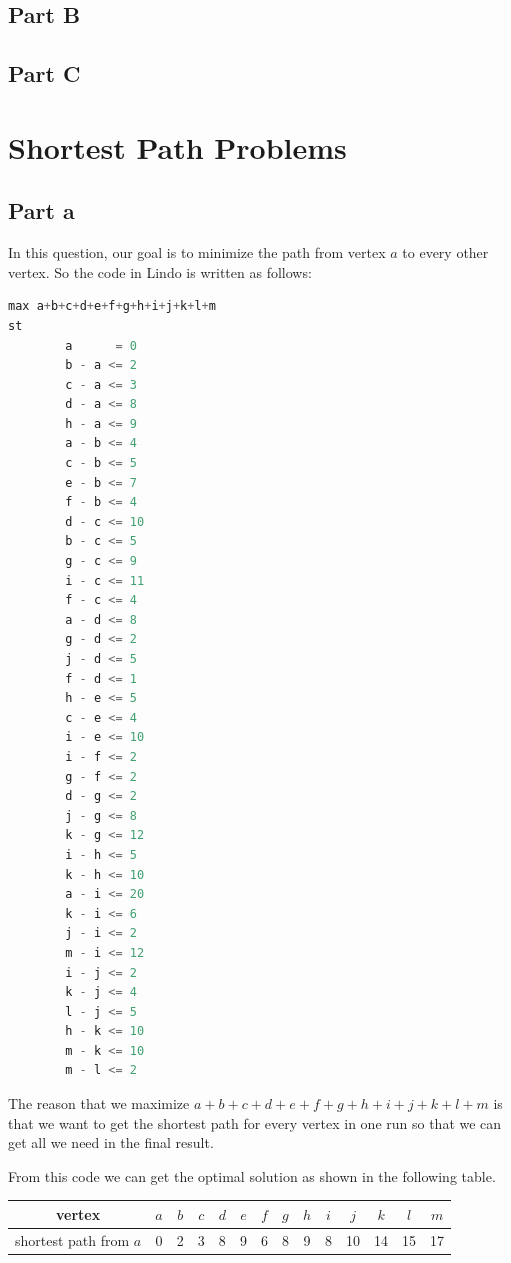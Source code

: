 \documentclass[11pt]{scrreprt}
\begin{document}
\section{Part B}


\section{Part C}

\chapter{Shortest Path Problems}

\section{Part a}
In this question, our goal is to minimize the path from vertex $a$ to every other vertex. So the code in Lindo is written as follows:
\begin{lstlisting}[language=c]
max a+b+c+d+e+f+g+h+i+j+k+l+m
st
        a      = 0 
        b - a <= 2
        c - a <= 3
        d - a <= 8
        h - a <= 9
        a - b <= 4
        c - b <= 5
        e - b <= 7
        f - b <= 4
        d - c <= 10
        b - c <= 5
        g - c <= 9
        i - c <= 11
        f - c <= 4
        a - d <= 8
        g - d <= 2
        j - d <= 5
        f - d <= 1
        h - e <= 5
        c - e <= 4
        i - e <= 10
        i - f <= 2
        g - f <= 2
        d - g <= 2
        j - g <= 8
        k - g <= 12
        i - h <= 5
        k - h <= 10
        a - i <= 20
        k - i <= 6
        j - i <= 2
        m - i <= 12
        i - j <= 2
        k - j <= 4
        l - j <= 5
        h - k <= 10
        m - k <= 10
        m - l <= 2
\end{lstlisting}

The reason that we maximize $a+b+c+d+e+f+g+h+i+j+k+l+m$ is that we want to get the shortest path for every vertex in one run so that we can get all we need in the final result.

From this code we can get the optimal solution as shown in the following table.\\
\begin{tabular}{|c|c|c|c|c|c|c|c|c|c|c|c|c|c|}
	\hline vertex & $a$   &  $b$ & $c$ & $d$ & $e$ & $f$ & $g$ & $h$ & $i$  & $j$ & $k$ & $l$ & $m$   \\
	\hline shortest path from $a$ & 0 & 2 & 3 & 8 & 9 & 6 & 8 & 9 & 8 & 10 & 14 & 15 & 17       \\
	\hline
\end{tabular} \\
\end{document}
